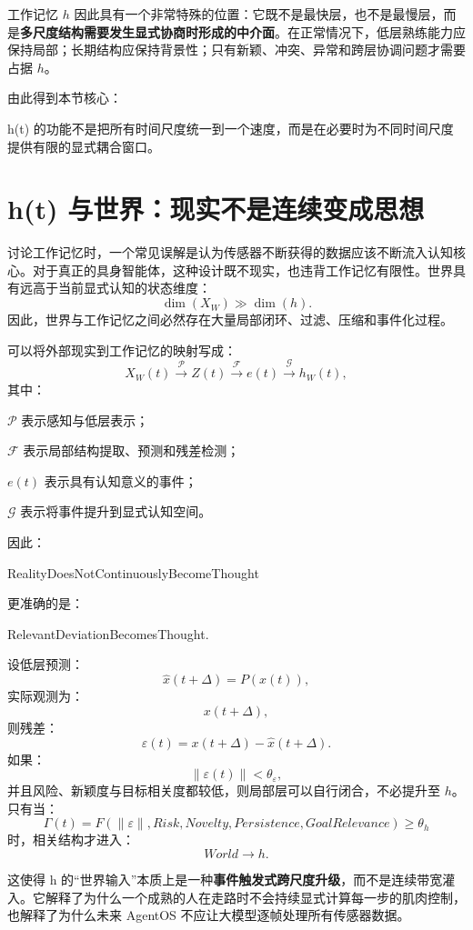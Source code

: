 工作记忆 $h$ 因此具有一个非常特殊的位置：它既不是最快层，也不是最慢层，而是\textbf{多尺度结构需要发生显式协商时形成的中介面}。在正常情况下，低层熟练能力应保持局部；长期结构应保持背景性；只有新颖、冲突、异常和跨层协调问题才需要占据 $h$。

由此得到本节核心：
\begin{statementbox}
h(t) 的功能不是把所有时间尺度统一到一个速度，而是在必要时为不同时间尺度提供有限的显式耦合窗口。
\end{statementbox}

\section{h(t) 与世界：现实不是连续变成思想}

讨论工作记忆时，一个常见误解是认为传感器不断获得的数据应该不断流入认知核心。对于真正的具身智能体，这种设计既不现实，也违背工作记忆有限性。世界具有远高于当前显式认知的状态维度：
\[
\dim(X_W)
\gg
\dim(h).
\]
因此，世界与工作记忆之间必然存在大量局部闭环、过滤、压缩和事件化过程。

可以将外部现实到工作记忆的映射写成：
\[
X_W(t)
\xrightarrow{\mathcal P}
Z(t)
\xrightarrow{\mathcal F}
e(t)
\xrightarrow{\mathcal G}
h_W(t),
\]
其中：

$\mathcal P$ 表示感知与低层表示；

$\mathcal F$ 表示局部结构提取、预测和残差检测；

$e(t)$ 表示具有认知意义的事件；

$\mathcal G$ 表示将事件提升到显式认知空间。

因此：
\begin{statementbox}
RealityDoesNotContinuouslyBecomeThought
\end{statementbox}
更准确的是：
\begin{statementbox}
RelevantDeviationBecomesThought.
\end{statementbox}

设低层预测：
\[
\hat x(t+\Delta)
=
P(x(t)),
\]
实际观测为：
\[
x(t+\Delta),
\]
则残差：
\[
\varepsilon(t)
=
x(t+\Delta)-\hat x(t+\Delta).
\]
如果：
\[
\|\varepsilon(t)\|<\theta_\varepsilon,
\]
并且风险、新颖度与目标相关度都较低，则局部层可以自行闭合，不必提升至 $h$。只有当：
\[
\Gamma(t)
=
F
\left(
\|\varepsilon\|,
Risk,
Novelty,
Persistence,
GoalRelevance
\right)
\geq
\theta_h
\]
时，相关结构才进入：
\[
World\rightarrow h.
\]

这使得 h 的“世界输入”本质上是一种\textbf{事件触发式跨尺度升级}，而不是连续带宽灌入。它解释了为什么一个成熟的人在走路时不会持续显式计算每一步的肌肉控制，也解释了为什么未来 AgentOS 不应让大模型逐帧处理所有传感器数据。

